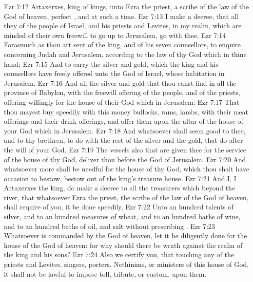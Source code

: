 \vs Ezr 7:12 Artaxerxes, king of kings, unto Ezra the priest, a scribe of the law of the God of heaven, perfect , and at such a time.
\vs Ezr 7:13 I make a decree, that all they of the people of Israel, and  his priests and Levites, in my realm, which are minded of their own freewill to go up to Jerusalem, go with thee.
\vs Ezr 7:14 Forasmuch as thou art sent of the king, and of his seven counsellors, to enquire concerning Judah and Jerusalem, according to the law of thy God which  in thine hand;
\vs Ezr 7:15 And to carry the silver and gold, which the king and his counsellors have freely offered unto the God of Israel, whose habitation  in Jerusalem,
\vs Ezr 7:16 And all the silver and gold that thou canst find in all the province of Babylon, with the freewill offering of the people, and of the priests, offering willingly for the house of their God which  in Jerusalem:
\vs Ezr 7:17 That thou mayest buy speedily with this money bullocks, rams, lambs, with their meat offerings and their drink offerings, and offer them upon the altar of the house of your God which  in Jerusalem.
\vs Ezr 7:18 And whatsoever shall seem good to thee, and to thy brethren, to do with the rest of the silver and the gold, that do after the will of your God.
\vs Ezr 7:19 The vessels also that are given thee for the service of the house of thy God,  deliver thou before the God of Jerusalem.
\vs Ezr 7:20 And whatsoever more shall be needful for the house of thy God, which thou shalt have occasion to bestow, bestow  out of the king's treasure house.
\vs Ezr 7:21 And I,  I Artaxerxes the king, do make a decree to all the treasurers which  beyond the river, that whatsoever Ezra the priest, the scribe of the law of the God of heaven, shall require of you, it be done speedily,
\vs Ezr 7:22 Unto an hundred talents of silver, and to an hundred measures of wheat, and to an hundred baths of wine, and to an hundred baths of oil, and salt without prescribing .
\vs Ezr 7:23 Whatsoever is commanded by the God of heaven, let it be diligently done for the house of the God of heaven: for why should there be wrath against the realm of the king and his sons?
\vs Ezr 7:24 Also we certify you, that touching any of the priests and Levites, singers, porters, Nethinims, or ministers of this house of God, it shall not be lawful to impose toll, tribute, or custom, upon them.
